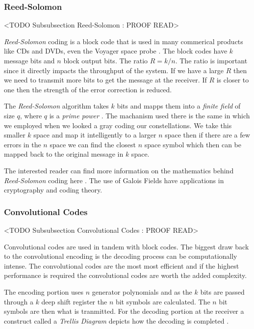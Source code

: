 	
	
\subsubsection{Reed-Solomon}
	<TODO Subsubsection  Reed-Solomon : PROOF READ>

\emph{Reed-Solomon} coding is a block code that is used in many commerical products like \ac{CD}s and \ac{DVD}s, even the Voyager space probe \cite{voyager}. The block codes have $k$ message bits and $n$ block output bits. The ratio $R=k/n$. The ratio is important since it directly impacts the throughput of the system. If we have a large $R$ then we need to transmit more bits to get the message at the receiver. If $R$ is closer to one then the strength of the error correction is reduced.

The \emph{Reed-Solomon} algorithm takes $k$ bits and mapps them into a \emph{finite field} of size $q$, where $q$ is a \emph{prime power} \cite{Sklar}. The machanism used there is the same in which we employed when we looked a gray coding our constellations. We take this smaller $k$ space and map it intelligently to a larger $n$ space then if there are a few errors in the $n$ space we can find the closest $n$ space symbol which then can be mapped back to the original message in $k$ space.

The interested reader can find more information on the mathematics behind \emph{Reed-Solomon} coding here \cite{rsmath}. The use of Galois Fields have applications in cryptography and coding theory. 
	
	
\subsubsection{Convolutional Codes}
	<TODO Subsubsection  Convolutional Codes : PROOF READ>

Convolutional codes are used in tandem with block codes. The biggest draw back to the convolutional encoding is the decoding process can be computationally intense. The convolutional codes are the most most efficient and if the highest performance is required the convolutional codes are worth the added complexity.

The encoding portion uses $n$ generator polynomials and as the $k$ bits are passed through a $k$ deep shift register the $n$ bit symbols are calculated. The $n$ bit symbols are then what is tranmitted. For the decoding portion at the receiver a construct called a \emph{Trellis Diagram} depicts how the decoding is completed \cite{trellis}.


